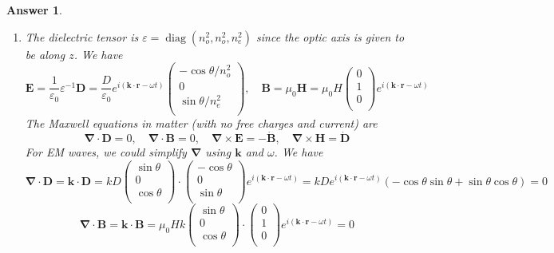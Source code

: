 \documentclass[a4paper]{article}
\DeclareMathOperator{\diag}{diag}
\newtheorem{ans}{Answer}
\theoremstyle{new}
\begin{document}
\newpage
\begin{ans}\leavevmode
\begin{enumerate}[label=(\alph*)]
\item The dielectric tensor is $\varepsilon=\diag(n_o^2,n_o^2,n_e^2)$ since the optic axis is given to be along $z$. We have
$$\mathbf{E}=\frac{1}{\varepsilon_0}\varepsilon^{-1}\mathbf{D}=\frac{D}{\varepsilon_0}e^{i(\mathbf{k}\cdot\mathbf{r}-\omega t)}\begin{pmatrix}-\cos\theta/n_o^2\\0\\\sin\theta/n_e^2\\\end{pmatrix},\quad\mathbf{B}=\mu_0\mathbf{H}=\mu_0H\begin{pmatrix}0\\1\\0\\\end{pmatrix}e^{i(\mathbf{k}\cdot\mathbf{r}-\omega t)}$$
The Maxwell equations in matter (with no free charges and current) are
$$\boldsymbol{\nabla}\cdot\mathbf{D}=0,\quad\boldsymbol{\nabla}\cdot\mathbf{B}=0,\quad\boldsymbol{\nabla}\times\mathbf{E}=-\mathbf{\dot{B}},\quad\boldsymbol{\nabla}\times\mathbf{H}=\mathbf{\dot{D}}$$
For EM waves, we could simplify $\boldsymbol{\nabla}$ using $\mathbf{k}$ and $\omega$. We have
$$\boldsymbol{\nabla}\cdot\mathbf{D}=\mathbf{k}\cdot\mathbf{D}=kD\begin{pmatrix}\sin\theta\\0\\\cos\theta\\\end{pmatrix}\cdot\begin{pmatrix}-\cos\theta\\0\\\sin\theta\\\end{pmatrix}e^{i(\mathbf{k}\cdot\mathbf{r}-\omega t)}=kDe^{i(\mathbf{k}\cdot\mathbf{r}-\omega t)}(-\cos\theta\sin\theta+\sin\theta\cos\theta)=0$$
$$\boldsymbol{\nabla}\cdot\mathbf{B}=\mathbf{k}\cdot\mathbf{B}=\mu_0Hk\begin{pmatrix}\sin\theta\\0\\\cos\theta\\\end{pmatrix}\cdot\begin{pmatrix}0\\1\\0\\\end{pmatrix}e^{i(\mathbf{k}\cdot\mathbf{r}-\omega t)}=0$$

\end{enumerate}
\end{ans}
\end{document}
